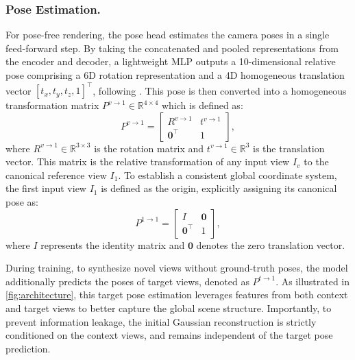\documentclass[runningheads]{llncs}
\begin{document}
\subsubsection{Pose Estimation.}
For pose-free rendering, the pose head estimates the camera poses in a single feed-forward step. By taking the concatenated and pooled representations from the encoder and decoder, a lightweight MLP outputs a 10-dimensional relative pose comprising a 6D rotation representation and a 4D homogeneous translation vector $[t_x, t_y, t_z, 1]^\top$, following \cite{chen2024marepo}. This pose is then converted into a homogeneous transformation matrix $P^{v \to 1} \in \mathbb{R}^{4 \times 4}$ which is defined as:
\begin{equation}
    P^{v \to 1} = \begin{bmatrix} R^{v \to 1} & t^{v \to 1} \\ 
    \mathbf{0}^\top & 1 \end{bmatrix},
    \label{eq:contextpose}
\end{equation}
where $R^{v \to 1} \in \mathbb{R}^{3 \times 3}$ is the rotation matrix and $t^{v \to 1} \in \mathbb{R}^3$ is the translation vector. This matrix is the relative transformation of any input view $I_v$ to the canonical reference view $I_1$. To establish a consistent global coordinate system, the first input view $I_1$ is defined as the origin, explicitly assigning its canonical pose as:
\begin{equation}
    P^{1 \to 1} = \begin{bmatrix} I & \mathbf{0} \\ \mathbf{0}^\top & 1
    \end{bmatrix},
    \label{eq:canonicalpose}
\end{equation}
where $I$ represents the identity matrix and $\mathbf{0}$ denotes the zero translation vector.

During training, to synthesize novel views without ground-truth poses, the model additionally predicts the poses of target views, denoted as $P^{t \to 1}$. As illustrated in \cref{fig:architecture}, this target pose estimation leverages features from both context and target views to better capture the global scene structure. Importantly, to prevent information leakage, the initial Gaussian reconstruction is strictly conditioned on the context views, and remains independent of the target pose prediction.
\end{document}
